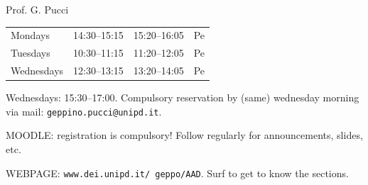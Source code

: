 Prof. G. Pucci
\begin{tabular}{llll}
Mondays & 14:30--15:15 & 15:20--16:05 & Pe\\
Tuesdays & 10:30--11:15 & 11:20--12:05 & Pe\\
Wednesdays & 12:30--13:15 & 13:20--14:05 & Pe
\end{tabular}

Wednesdays: 15:30--17:00.
Compulsory reservation by (same) wednesday morning via mail:
\texttt{geppino.pucci@unipd.it}.

MOODLE: registration is compulsory! Follow regularly for announcements, slides, etc.


WEBPAGE: \texttt{www.dei.unipd.it/\string~geppo/AAD}.
Surf to get to know the sections.
